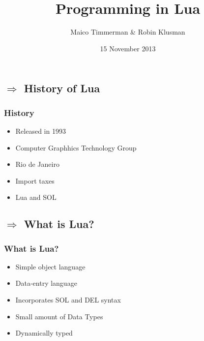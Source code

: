\documentclass{beamer}
\begin{document}
\title{Programming in Lua}
\author{Maico Timmerman \& Robin Klusman}
\date{15 November 2013}

\begin{frame}
    \maketitle
\end{frame}

\begin{frame}
    \section{$ \Rightarrow $ History of Lua}
    \frametitle{History}
    \begin{itemize}
        \item{Released in 1993}
        \item{Computer Graphhics Technology Group}
        \item{Rio de Janeiro}
        \item{Import taxes}
        \item{Lua and SOL}
    \end{itemize}	
\end{frame}

\begin{frame}
    \section{$ \Rightarrow $ What is Lua?}
    \frametitle{What is Lua?}
    \begin{itemize}
        \item{Simple object language}
        \item{Data-entry language}
        \item{Incorporates SOL and DEL syntax}
        \item{Small amount of Data Types}
        \item{Dynamically typed}
    \end{itemize}
\end{frame}
\end{document}
